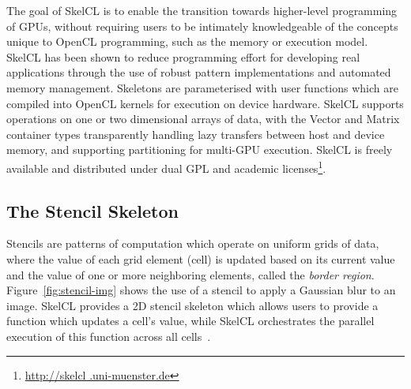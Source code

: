 \documentclass[nonatbib,preprint,nocopyrightspace,9pt]{sigplanconf}
\begin{document}
  The goal of SkelCL is to enable the transition towards higher-level programming
  of GPUs, without requiring users to be intimately knowledgeable of the concepts
  unique to OpenCL programming, such as the memory or execution model. SkelCL has
  been shown to reduce programming effort for developing real applications through
  the use of robust pattern implementations and automated memory management.
  Skeletons are parameterised with user functions which are compiled into OpenCL
  kernels for execution on device hardware. SkelCL supports operations on one or
  two dimensional arrays of data, with the Vector and Matrix container types
  transparently handling lazy transfers between host and device memory, and
  supporting partitioning for multi-GPU execution. SkelCL is freely available and
  distributed under dual GPL and academic licenses\footnote{\url{http://skelcl
  .uni-muenster.de}}.

  \subsection{The Stencil Skeleton}

  Stencils are patterns of computation which operate on uniform grids of data,
  where the value of each grid element (cell) is updated based on its current
  value and the value of one or more neighboring elements, called the \emph{border
  region}. Figure~\ref{fig:stencil-img} shows the use of a stencil to apply a
  Gaussian blur to an image. SkelCL provides a 2D stencil skeleton which allows
  users to provide a function which updates a cell's value, while SkelCL
  orchestrates the parallel execution of this function across all
  cells~\cite{Steuwer2014a}.
\end{document}
